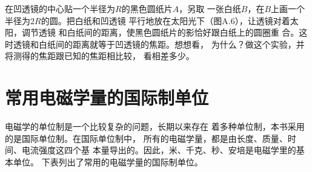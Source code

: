 在凹透镜的中心贴一个半径为$R$的黑色圆纸片$A$，另取
一张白纸$B$，在$B$上画一个半径为$2R$的圆。把白纸和凹透镜
平行地放在太阳光下（图A.6），让透镜对着太阳，调节透镜
和白纸间的距离，使黑色圆纸片的影恰好跟白纸上的圆圈重
合。这时透镜和白纸间的距离就等于凹透镜的焦距。想想看，
为什么？做这个实验，并将测得的焦距跟已知的焦距相比较，
看相差多少。















































































\chapter{常用电磁学量的国际制单位}

电磁学的单位制是一个比较复杂的问题，长期以来存在
着多种单位制，本书采用的是国际单位制。在国际单位制中，
所有的电磁学量，都是由长度、质量、时间、电流强度这四个基
本量导出的。因此，米、千克、秒、安培是电磁学里的基本单位。
下表列出了常用的电磁学量的国际制单位。


